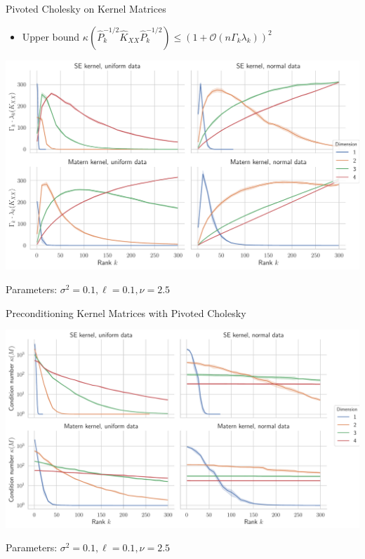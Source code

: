 \documentclass{beamer}
\begin{document}
\begin{frame}{Pivoted Cholesky on Kernel Matrices}
\begin{itemize}
    \item Upper bound $\kappa \left( \widehat P_k^{- 1/ 2} \widehat K_{XX} \widehat P_k^{- 1/2} \right) \le (1 + \mathcal O(n\Gamma_k \lambda_k) )^2$
\end{itemize}
\begin{center}
    \includegraphics[width=\textwidth]{report/res/pivchol_upperbound.pdf}
\end{center}
{\tiny Parameters: $\sigma^2 = 0.1, \ell = 0.1, \nu = 2.5$}
\end{frame}

\begin{frame}{Preconditioning Kernel Matrices with Pivoted Cholesky}
\begin{center}
    \includegraphics[width=\textwidth]{report/res/pivchol_cond.pdf}
\end{center}
{\tiny Parameters: $\sigma^2 = 0.1, \ell = 0.1, \nu = 2.5$}
\end{frame}
\end{document}
